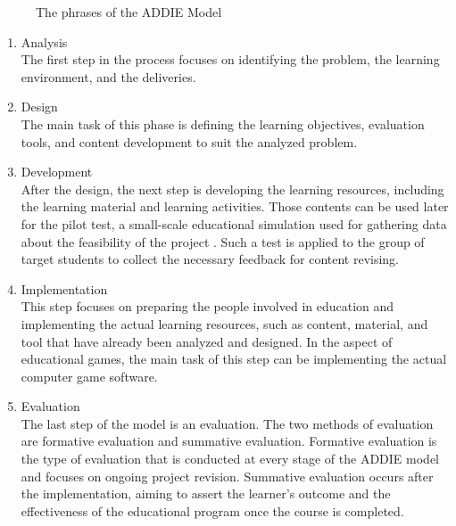 \documentclass[12pt,oneside,openright,a4paper]{cpe-english-project}
\begin{document}
\begin{figure}[!h]\centering
{}
\caption[The phrases of the ADDIE Model]{The phrases of the ADDIE Model \cite{isfetaddie}}
\label{fig:theory-ADDIE}
\end{figure}

\begin{enumerate}
	\item Analysis \\
	The first step in the process focuses on identifying the problem, the learning environment, and the deliveries.
	\item Design \\
	The main task of this phase is defining the learning objectives, evaluation tools, and content development to suit the analyzed problem.
	\item Development \\
	After the design, the next step is developing the learning resources, including the learning material and learning activities. Those contents can be used later for the pilot test, a small-scale educational simulation used for gathering data about the feasibility of the project \cite{michiganpilot}. Such a test is applied to the group of target students to collect the necessary feedback for content revising.
	\item Implementation \\
	This step focuses on preparing the people involved in education and implementing the actual learning resources, such as content, material, and tool that have already been analyzed and designed. In the aspect of educational games, the main task of this step can be implementing the actual computer game software.
	\item Evaluation \\
	The last step of the model is an evaluation. The two methods of evaluation are formative evaluation and summative evaluation. Formative evaluation is the type of evaluation that is conducted at every stage of the ADDIE model and focuses on ongoing project revision. Summative evaluation occurs after the implementation, aiming to assert the learner's outcome and the effectiveness of the educational program once the course is completed.
\end{enumerate}
\end{document}
